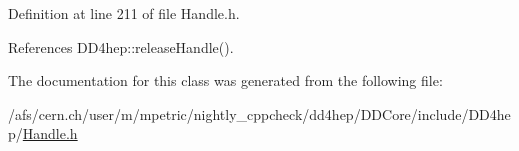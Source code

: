 Definition at line 211 of file Handle.\+h.



References D\+D4hep\+::release\+Handle().



The documentation for this class was generated from the following file\+:\begin{DoxyCompactItemize}
\item 
/afs/cern.\+ch/user/m/mpetric/nightly\+\_\+cppcheck/dd4hep/\+D\+D\+Core/include/\+D\+D4hep/\hyperlink{_handle_8h}{Handle.\+h}\end{DoxyCompactItemize}
